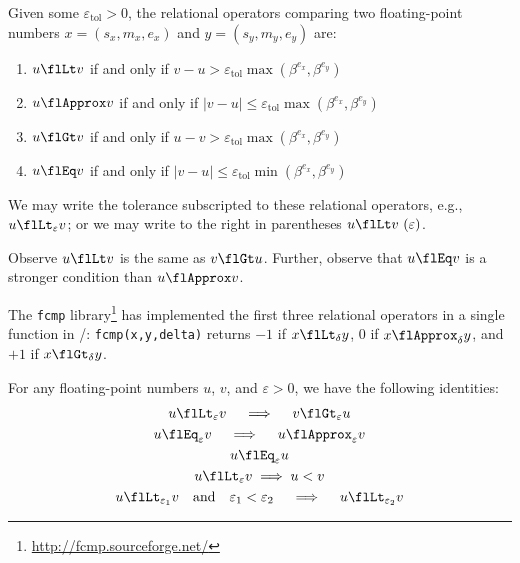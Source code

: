 \begin{defn}
  Given some $\varepsilon_{\text{tol}}>0$,
  the relational operators comparing two floating-point numbers
  $x=(s_{x},m_{x},e_{x})$ and $y=(s_{y},m_{y},e_{y})$ are:
  \begin{enumerate}
  \item {} $u\flLt v$ if and only if
    $v-u > \varepsilon_{\text{tol}}\max(\beta^{e_{x}},\beta^{e_{y}})$
  \item {} $u\flApprox v$ if and only if
    $|v-u|\leq\varepsilon_{\text{tol}}\max(\beta^{e_{x}},\beta^{e_{y}})$
  \item {} $u\flGt v$ if and only if
    $u-v > \varepsilon_{\text{tol}}\max(\beta^{e_{x}},\beta^{e_{y}})$
  \item {} $u\flEq v$ if and only if
    $|v-u|\leq\varepsilon_{\text{tol}}\min(\beta^{e_{x}},\beta^{e_{y}})$
  \end{enumerate}
\end{defn}
\begin{notation}
  We may write the tolerance subscripted to these relational operators,
  e.g., $u\flLt_{\varepsilon}v$; or we may write to the right in
  parentheses $u\flLt v~(\varepsilon)$.
\end{notation}
\begin{rmk}
  Observe $u\flLt v$ is the same as $v\flGt u$. Further, observe that
  $u\flEq v$ is a stronger condition than $u\flApprox v$.
\end{rmk}
\begin{rmk}
  The {\tt fcmp} library\footnote{\url{http://fcmp.sourceforge.net/}} has implemented the first three relational
  operators in a single function in \CEE/: \verb|fcmp(x,y,delta)| returns $-1$
  if $x\flLt_{\delta} y$, 0 if $x\flApprox_{\delta} y$, and $+1$ if $x\flGt_{\delta} y$.
\end{rmk}
\begin{thm}
  For any floating-point numbers $u$, $v$, and $\varepsilon>0$, we have
  the following identities:
  \begin{gather}
    u\flLt_{\varepsilon} v\quad\implies\quad v\flGt_{\varepsilon} u\\
    u\flEq_{\varepsilon} v\quad\implies\quad u\flApprox_{\varepsilon}v\\
    u\flEq_{\varepsilon} u\\
    u\flLt_{\varepsilon} v\implies u < v\\
    u\flLt_{\varepsilon_{1}}v\quad\mbox{and}\quad \varepsilon_{1}<\varepsilon_{2}\quad\implies\quad
    u\flLt_{\varepsilon_{2}}v
  \end{gather}
\end{thm}
